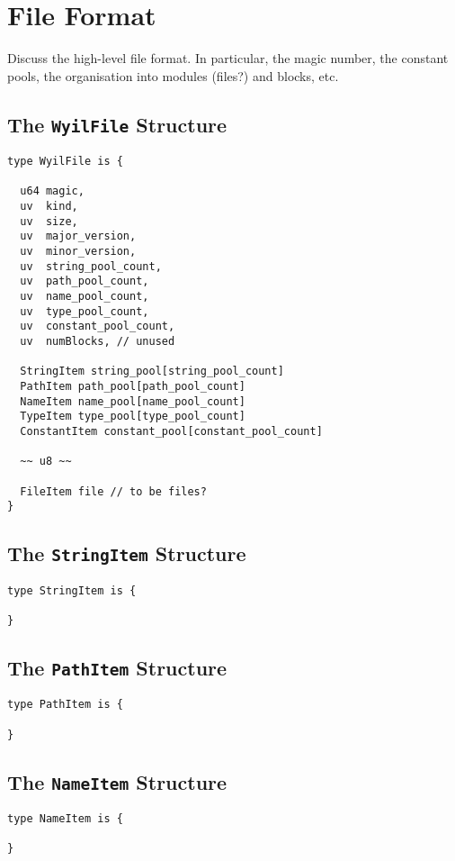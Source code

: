 \chapter{File Format}
Discuss the high-level file format.  In particular, the magic number, the constant pools, the organisation into modules (files?) and blocks, etc.

\section{The {\tt WyilFile} Structure}

\begin{lstlisting}
type WyilFile is {

  u64 magic,
  uv  kind,
  uv  size,
  uv  major_version,
  uv  minor_version,
  uv  string_pool_count,
  uv  path_pool_count,
  uv  name_pool_count,
  uv  type_pool_count,
  uv  constant_pool_count,
  uv  numBlocks, // unused

  StringItem string_pool[string_pool_count]
  PathItem path_pool[path_pool_count]
  NameItem name_pool[name_pool_count]
  TypeItem type_pool[type_pool_count]
  ConstantItem constant_pool[constant_pool_count]

  ~~ u8 ~~

  FileItem file // to be files?
}
\end{lstlisting}

\section{The {\tt StringItem} Structure}

\begin{lstlisting}
type StringItem is {

}
\end{lstlisting}


\section{The {\tt PathItem} Structure}

\begin{lstlisting}
type PathItem is {

}
\end{lstlisting}


\section{The {\tt NameItem} Structure}

\begin{lstlisting}
type NameItem is {

}
\end{lstlisting}


